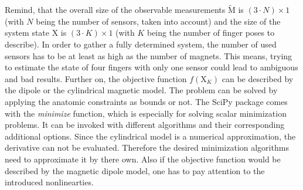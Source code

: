 Remind, that the overall size of the observable measurements $ \tilde{\mathrm{M}} $ is $ (3 \cdot N) \times 1 $ (with $ N $ being the number of sensors, taken into account) and the size of the system state $ \mathrm{X} $ is $ (3 \cdot K) \times 1 $ (with $ K $ being the number of finger poses to describe). In order to gather a fully determined system, the number of used sensors has to be at least as high as the number of magnets. This means, trying to estimate the state of four fingers with only one sensor could lead to ambiguous and bad results. Further on, the objective function $ f(\mathrm{X}_K) $ can be described by the dipole or the cylindrical magnetic model. The problem can be solved by applying the anatomic constraints as bounds or not. The SciPy package comes with the \emph{minimize} function, which is especially for solving scalar minimization problems. It can be invoked with different algorithms and their corresponding additional options. Since the cylindrical model is a numerical approximation, the derivative can not be evaluated. Therefore the desired minimization algorithms need to approximate it by there own. Also if the objective function would be described by the magnetic dipole model, one has to pay attention to the introduced nonlinearties.

